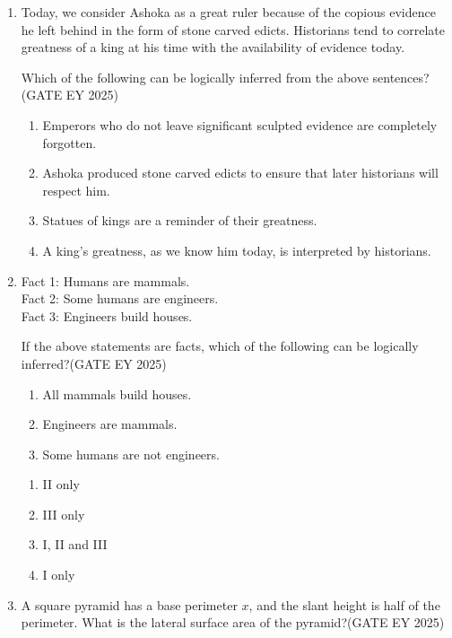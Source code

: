 \begin{enumerate}[leftmargin=*,label=\textbf{Q.\arabic*},resume]
\item Today, we consider Ashoka as a great ruler because of the copious evidence he left behind in the form of stone carved edicts. Historians tend to correlate greatness of a king at his time with the availability of evidence today.

Which of the following can be logically inferred from the above sentences?\hfill {(GATE EY 2025)}
\begin{enumerate}
\item Emperors who do not leave significant sculpted evidence are completely forgotten.
\item Ashoka produced stone carved edicts to ensure that later historians will respect him.
\item Statues of kings are a reminder of their greatness.
\item A king’s greatness, as we know him today, is interpreted by historians.
\end{enumerate}

\item Fact 1: Humans are mammals.\\ 
Fact 2: Some humans are engineers.\\ 
Fact 3: Engineers build houses.

If the above statements are facts, which of the following can be logically inferred?\hfill {(GATE EY 2025)}

\begin{enumerate}[label=\roman*.]
\item All mammals build houses.
\item Engineers are mammals.
\item Some humans are not engineers.
\end{enumerate}

\begin{multicols}{2}
\begin{enumerate}
\item II only
\item III only
\item I, II and III
\item I only
\end{enumerate}
\end{multicols}

\item A square pyramid has a base perimeter $x$, and the slant height is half of the perimeter. What is the lateral surface area of the pyramid?\hfill {(GATE EY 2025)}


\end{enumerate}
